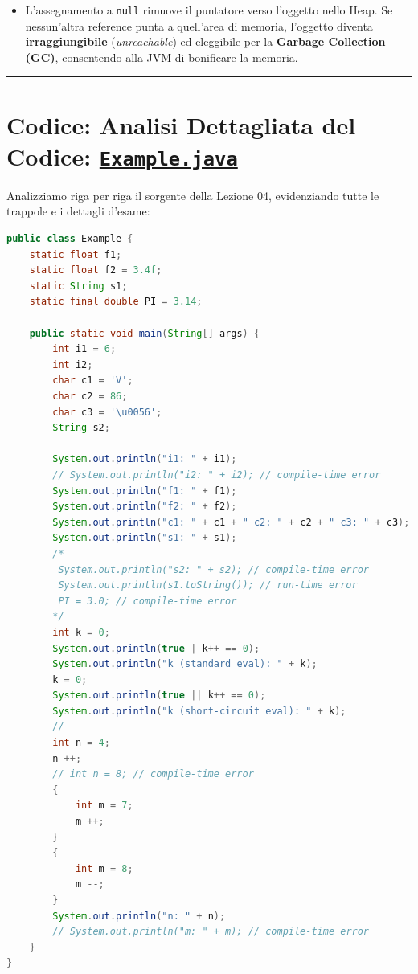 \documentclass[11pt,a4paper,oneside]{report}
\newcommand{\passthrough}[1]{#1}
\providecommand{\tightlist}{\setlength{\itemsep}{0pt}\setlength{\parskip}{0pt}}
\begin{document}
\begin{itemize}
  \begin{itemize}
  \tightlist
  \item
    L'assegnamento a \passthrough{\lstinline!null!} rimuove il puntatore
    verso l'oggetto nello Heap. Se nessun'altra reference punta a
    quell'area di memoria, l'oggetto diventa \textbf{irraggiungibile}
    (\emph{unreachable}) ed eleggibile per la \textbf{Garbage Collection
    (GC)}, consentendo alla JVM di bonificare la memoria.
  \end{itemize}
\end{itemize}

\begin{center}\rule{0.5\linewidth}{0.5pt}\end{center}

\section{\texorpdfstring{Codice: Analisi Dettagliata del Codice:
\href{file:///home/wally/Documenti/GitHub/Programmazione-II/25-26/Teoria-e-Esercitazioni/Codice-20260902/Lezione04/Example.java}{\texttt{Example.java}}}{Codice: Analisi Dettagliata del Codice: Example.java}}\label{chap04_codice-analisi-dettagliata-del-codice-example.java}

Analizziamo riga per riga il sorgente della Lezione 04, evidenziando
tutte le trappole e i dettagli d'esame:

\begin{lstlisting}[language=Java]
public class Example {
    static float f1;
    static float f2 = 3.4f;
    static String s1;
    static final double PI = 3.14; 
    
    public static void main(String[] args) {
        int i1 = 6;
        int i2;
        char c1 = 'V';
        char c2 = 86;
        char c3 = '\u0056';
        String s2;
            
        System.out.println("i1: " + i1);
        // System.out.println("i2: " + i2); // compile-time error
        System.out.println("f1: " + f1);
        System.out.println("f2: " + f2);
        System.out.println("c1: " + c1 + " c2: " + c2 + " c3: " + c3);
        System.out.println("s1: " + s1);
        /*
         System.out.println("s2: " + s2); // compile-time error
         System.out.println(s1.toString()); // run-time error
         PI = 3.0; // compile-time error
        */
        int k = 0;
        System.out.println(true | k++ == 0);
        System.out.println("k (standard eval): " + k);
        k = 0;
        System.out.println(true || k++ == 0);
        System.out.println("k (short-circuit eval): " + k);
        //
        int n = 4;
        n ++;
        // int n = 8; // compile-time error
        {
            int m = 7;
            m ++;
        }
        {
            int m = 8;
            m --;
        }
        System.out.println("n: " + n);
        // System.out.println("m: " + m); // compile-time error
    }
}
\end{lstlisting}
\end{document}
